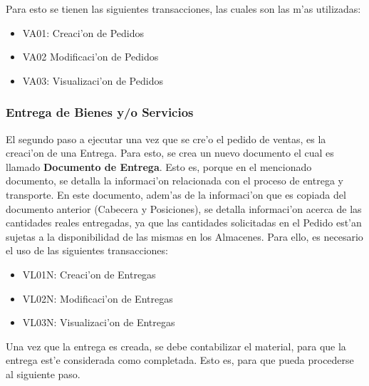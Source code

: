 Para esto se tienen las siguientes transacciones, las cuales son las m'as utilizadas:
\begin{itemize}
\item VA01: Creaci'on de Pedidos
\item VA02 Modificaci'on de Pedidos
\item VA03: Visualizaci'on de Pedidos
\end{itemize}
	
\subsubsection*{Entrega de Bienes y/o Servicios}
	El segundo paso a ejecutar una vez que se cre'o el pedido de ventas, es la creaci'on de una  Entrega. Para esto, se crea un nuevo documento el cual es llamado \textbf{Documento de Entrega}. Esto es, porque en el mencionado documento, se detalla la informaci'on relacionada con el proceso de entrega y transporte. En este documento, adem'as de la informaci'on que es copiada del documento anterior (Cabecera y Posiciones), se detalla informaci'on acerca de las cantidades reales entregadas, ya que las cantidades solicitadas en el Pedido est'an sujetas a la disponibilidad de las mismas en los Almacenes. Para ello, es necesario el uso de las siguientes transacciones:
\begin{itemize}
\item VL01N: Creaci'on de Entregas
\item VL02N: Modificaci'on de Entregas
\item VL03N: Visualizaci'on de Entregas
\end{itemize}
\indent Una vez que la entrega es creada, se debe contabilizar el material, para que la entrega est'e considerada como completada. Esto es, para que pueda procederse al siguiente paso.
	

